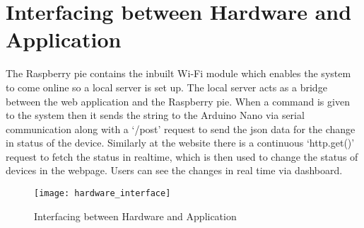         \section{Interfacing between Hardware and Application}
        The Raspberry pie contains the inbuilt Wi-Fi module which enables the system to come online so a local server is set up. The local server acts as a bridge between the web application and the Raspberry pie. When a command is given to the system then it sends the string to the Arduino Nano via serial communication along with a ‘/post’ request to send the json data for the change in status of the device. Similarly at the website there is a continuous ‘http.get()’ request to fetch the status in realtime, which is then used to change the status of devices in the webpage. Users can see the changes in real time via dashboard.

        \begin{figure}[h]
            \centering
            \texttt{[image: hardware\_interface]}
            \caption{Interfacing between Hardware and Application}
            \label{fig:hardware_interface}
        \end{figure}

        